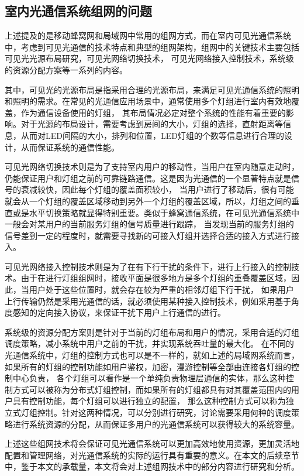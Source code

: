 \subsection{室内光通信系统组网的问题}
上述提及的是移动蜂窝网和局域网中常用的组网方式，而在室内可见光通信系统中，考虑到可见光通信的技术特点和典型的组网架构，组网中的关键技术主要包括可见光光源布局研究，可见光网络切换技术，
可见光网络接入控制技术，系统级的资源分配方案等一系列的内容\cite{LiuYang2014}。

其中，可见光的光源布局是指采用合理的光源布局，来满足可见光通信系统的照明和照明的需求。在常见的光通信应用场景中，通常使用多个灯组进行室内有效地覆盖，作为通信设备使用的灯组，
其布局情况必定对整个系统的性能有着重要的影响。对于光源的布局设计，需要考虑到房间的大小，灯组的选择，直射距离等信息，从而对LED间隔的大小，排列和位置，LED灯组的个数等信息进行合理的设计，从而保证系统的通信性能。

可见光网络切换技术则是为了支持室内用户的移动性，当用户在室内随意走动时，仍能保证用户和灯组之前的可靠链路通信。这是因为光通信的一个显著特点就是信号的衰减较快，因此每个灯组的覆盖面积较小，
当用户进行了移动后，很有可能就会从一个灯组的覆盖区域移动到另外一个灯组的覆盖区域，所以，灯组之间的垂直或是水平切换策略就显得特别重要。类似于蜂窝通信系统，在可见光通信系统中一般会对某用户的当前服务灯组的信号质量进行跟踪，
当发现当前的服务灯组的信号差到一定的程度时，就需要寻找新的可接入灯组并选择合适的接入方式进行接入。

可见光网络接入控制技术则是为了在有下行干扰的条件下，进行上行接入的控制技术。由于在进行灯组组网时，接收平面是很多地方是多个灯组的重叠覆盖区域，因此，当用户处于这些位置时，就会存在较为严重的相邻灯组下行干扰，
如果用户上行传输仍然是采用光通信的话，就必须使用某种接入控制技术，例如采用基于角度感知的定向接入协议，来保证干扰下用户上行通信的进行。

系统级的资源分配方案则是针对于当前的灯组布局和用户的情况，采用合适的灯组调度策略，减小系统中用户之前的干扰，并实现系统吞吐量的最大化。
在不同的光通信系统中，灯组的控制方式也可以是不一样的，就如上述的局域网系统而言，如果所有的灯组的控制功能如用户鉴权，加密，漫游控制等全部由连接各灯组的控制中心负责，
各个灯组可以看作是一个单纯负责物理层通信的实体，那么这种控制方式可以被称为分布式灯组控制，而如果所有的灯组都具有对其覆盖范围内的用户具有控制功能，每个灯组可以进行独立的配置，
那么这种控制方式可以称为独立式灯组控制。针对这两种情况，可以分别进行研究，讨论需要采用何种的调度策略进行系统资源的分配，从而保证多用户的光通信系统可以获得较大的系统容量。

上述这些组网技术将会保证可见光通信系统可以更加高效地使用资源，更加灵活地配置和管理网络，对光通信系统的实际的运行具有重要的意义。在本文的后续章节中，鉴于本文的承载量，本文将会对上述组网技术中的部分内容进行研究和分析。

